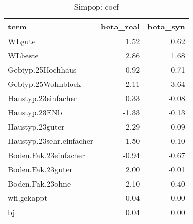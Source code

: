 \begin{table}[ht]
\centering
\begin{tabular}{lrr}
  \hline
term & beta\_real & beta\_syn \\ 
  \hline
WLgute & 1.52 & 0.62 \\ 
  WLbeste & 2.86 & 1.68 \\ 
  Gebtyp.25Hochhaus & -0.92 & -0.71 \\ 
  Gebtyp.25Wohnblock & -2.11 & -3.64 \\ 
  Haustyp.23einfacher & 0.33 & -0.08 \\ 
  Haustyp.23ENb & -1.33 & -0.13 \\ 
  Haustyp.23guter & 2.29 & -0.09 \\ 
  Haustyp.23sehr.einfacher & -1.50 & -0.10 \\ 
  Boden.Fak.23einfacher & -0.94 & -0.67 \\ 
  Boden.Fak.23guter & 2.00 & -0.01 \\ 
  Boden.Fak.23ohne & -2.10 & 0.40 \\ 
  wfl.gekappt & -0.04 & 0.00 \\ 
  bj & 0.04 & 0.00 \\ 
   \hline
\end{tabular}
\caption{Simpop: coef} 
\end{table}
